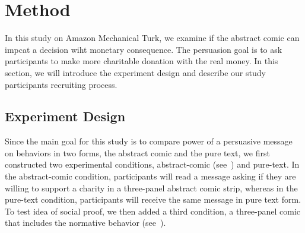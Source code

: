 \section{Method}
\label{sec:Method2}
In this study on Amazon Mechanical Turk, we examine if the abstract comic can impcat a decision wiht monetary consequence. The persuasion goal is to ask participants to make more charitable donation with the real money. 
In this section, we will introduce the experiment design and describe our study participants recruiting process.




\subsection{Experiment Design}
Since the main goal for this study is to compare power of a persuasive message on behaviors in two forms, the abstract comic and the pure text, we first constructed two experimental conditions, abstract-comic (see~) and pure-text. In the abstract-comic condition, participants will read a message asking if they are willing to support a charity in a three-panel abstract comic strip, whereas in the pure-text condition, participants will receive the same message in pure text form. To test idea of social proof, we then added a third condition, a three-panel comic that includes the normative behavior (see~).

